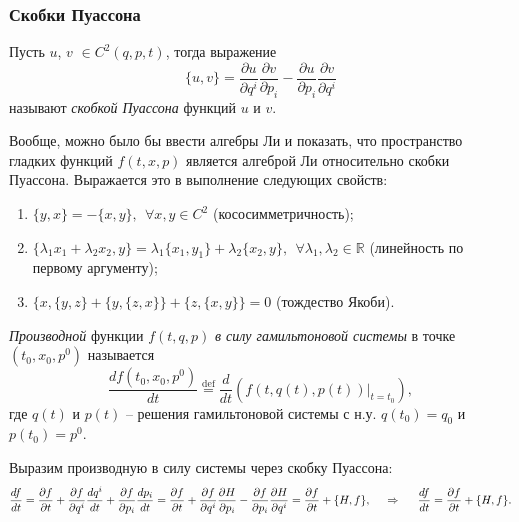 

\subsubsection*{Скобки Пуассона}

\begin{to_def} 
    Пусть $u$, $v$ $\in C^2(q, p, t)$, тогда выражение
    \begin{equation*}
        \{u, v\}  
        =
        \frac{\partial u}{\partial q^i} \frac{\partial v}{\partial p_i} -
        \frac{\partial u}{\partial p_i} \frac{\partial v}{\partial q^i}
    \end{equation*}  
    называют \textit{скобкой Пуассона} функций $u$ и $v$.
\end{to_def}

Вообще, можно было бы ввести алгебры Ли и показать, что пространство гладких функций $f(t, x, p)$ является алгеброй Ли относительно скобки Пуассона. Выражается это в выполнение следующих свойств:
\begin{enumerate}
    \item $\{y, x\} = - \{x, y\}, \ \ \forall x, y \in C^2$ (кососимметричность);
    \item $\{\lambda_1 x_1 + \lambda_2 x_2, y\} = \lambda_1 \{x_1, y_1\} + \lambda_2 \{x_2, y\},
    \ \ \forall \lambda_1, \lambda_2 \in \mathbb{R}
    $ (линейность по первому аргументу);
    \item $\{x, \{y, z\} + \{y, \{z, x\}\} + \{z, \{x, y\}\} = 0$ (тождество Якоби).
\end{enumerate}

\begin{to_def} 
    \textit{Производной} функции $f(t, q, p)$ \textit{в силу гамильтоновой системы} в точке $(t_0, x_0, p^0)$ называется
    \begin{equation*}
         \frac{d f(t_0, x_0, p^0)}{d t} \overset{\mathrm{def}}{=} \frac{d }{d t} 
         \left(
            f(t, q(t), p(t)) \big|_{t=t_0}
         \right),
     \end{equation*} 
     где $q(t)$ и $p(t)$ -- решения гамильтоновой системы с н.у. $q(t_0) = q_0$ и $p(t_0) = p^0$. 
\end{to_def}

Выразим производную в силу системы через скобку Пуассона:
\begin{equation*}
    \frac{d f}{d t} 
    =
     \frac{\partial f}{\partial t} + \frac{\partial f}{\partial q^i} \frac{d q^i}{d t} + \frac{\partial f}{\partial p_i} \frac{d p_i}{d t} 
     =
      \frac{\partial f}{\partial t} + \frac{\partial f}{\partial q^i} \frac{\partial H}{\partial p_i} - \frac{\partial f}{\partial p_i} \frac{\partial H}{\partial q^i} = \frac{\partial f}{\partial t} + \{H, f\},
      \hspace{0.5cm} \Rightarrow \hspace{0.5cm} 
      \frac{d f}{d t} = \frac{\partial f}{\partial t} + \{H, f\}.
\end{equation*}


